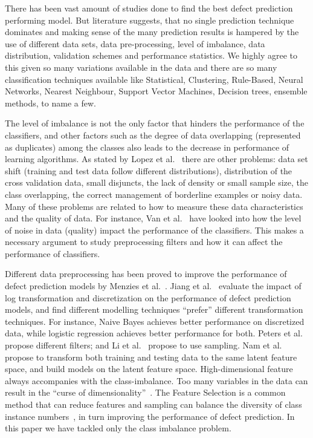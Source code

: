 \documentclass[sigconf,review, anonymous]{acmart}
\theoremstyle{break}
\theoremstyle{break}
\begin{document}
There has been vast amount of studies done to find the best defect prediction performing model. But literature suggests, that no single prediction technique dominates and making sense of the many prediction results is hampered by the use of different data sets, data pre-processing, level of imbalance, data distribution, validation schemes and performance
statistics. We highly agree to this given so many variations available in the data 
and there are so many classification techniques available like Statistical, Clustering, Rule-Based, Neural Networks, Nearest Neighbour, Support Vector Machines, Decision trees, ensemble methods, to name a few.

The level of imbalance is not the only factor that hinders
the performance of the classifiers, and other factors
such as the degree of data overlapping (represented
as duplicates) among the classes also leads to the decrease in performance of
learning algorithms. As stated by Lopez et al.~\cite{lopez2014importance,lopez2012analysis} there
are other problems: data set shift (training and test
data follow different distributions), distribution of the
cross validation data, small disjuncts, the lack of density
or small sample size, the class overlapping, the
correct management of borderline examples or noisy
data. Many of these problems are related to how to
measure these data characteristics and the quality of
data. For instance, Van et al.~\cite{van2009knowledge}
have looked into how the level of noise in data (quality) impact the performance of the classifiers. This makes a necessary argument to study preprocessing filters and how it can affect the performance of classifiers. 

Different data preprocessing has been proved
to improve the performance of defect prediction models by
Menzies et al.~\cite{menzies2007data}. Jiang et al.~\cite{jiang2008can} evaluate the impact of
log transformation and discretization on the performance
of defect prediction models, and find different modelling
techniques ``prefer'' different transformation techniques. For
instance, Naive Bayes achieves better performance on discretized
data, while logistic regression achieves better performance
for both. Peters et al.~\cite{peters2013better} propose different filters; and Li et al.~\cite{li2012sample} propose
to use sampling. Nam et al.~\cite{nam2013transfer} propose to transform both
training and testing data to the same latent feature space,
and build models on the latent feature space.  High-dimensional feature always accompanies with the class-imbalance. Too many variables in the data
can result in the ``curse of dimensionality''~\cite{friedman1997bias}. The Feature Selection is a common method that can
reduce features and sampling can balance the diversity of
class instance numbers~\cite{yin2015empirical}, in turn improving the performance of defect prediction. In this paper we have tackled only the class imbalance problem.
\end{document}
